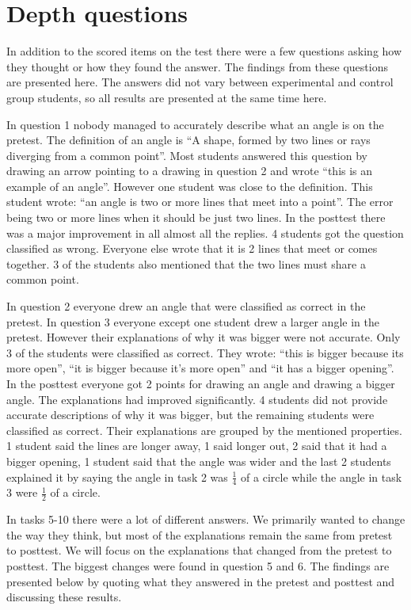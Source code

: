\chapter{Depth questions}
In addition to the scored items on the test there were a few questions asking how they thought or how they found the answer. The findings from these questions are presented here. The answers did not vary between experimental and control group students, so all results are presented at the same time here.

\bigskip\noindent
In question 1 nobody managed to accurately describe what an angle is on the pretest. The definition of an angle is ``A shape, formed by two lines or rays diverging from a common point''. Most students answered this question by drawing an arrow pointing to a drawing in question 2 and wrote ``this is an example of an angle''. However one student was close to the definition. This student wrote: ``an angle is two or more lines that meet into a point''. The error being two or more lines when it should be just two lines. In the posttest there was a major improvement in all almost all the replies. 4 students got the question classified as wrong. Everyone else wrote that it is 2 lines that meet or comes together. 3 of the students also mentioned that the two lines must share a common point.

\bigskip\noindent
In question 2 everyone drew an angle that were classified as correct in the pretest. In question 3 everyone except one student drew a larger angle in the pretest. However their explanations of why it was bigger were not accurate. Only 3 of the students were classified as correct. They wrote: ``this is bigger because its more open'', ``it is bigger because it's more open'' and ``it has a bigger opening''. In the posttest everyone got 2 points for drawing an angle and drawing a bigger angle. The explanations had improved significantly. 4 students did not provide accurate descriptions of why it was bigger, but the remaining students were classified as correct. Their explanations are grouped by the mentioned properties. 1 student said the lines are longer away, 1 said longer out, 2 said that it had a bigger opening, 1 student said that the angle was wider and the last 2 students explained it by saying the angle in task 2 was $\frac{1}{4}$ of a circle while the angle in task 3 were $\frac{1}{2}$ of a circle.

\bigskip\noindent
In tasks 5-10 there were a lot of different answers. We primarily wanted to change the way they think, but most of the explanations remain the same from pretest to posttest. We will focus on the explanations that changed from the pretest to posttest. The biggest changes were found in question 5 and 6. The findings are presented below by quoting what they answered in the pretest and posttest and discussing these results.

